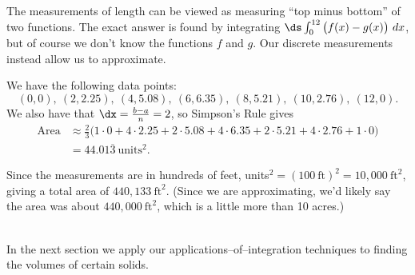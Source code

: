 {The measurements of length can be viewed as measuring ``top minus bottom'' of two functions. The exact answer is found by integrating $\ds \int_0^{12} \big(f(x)-g(x)\big)\ dx$, but of course we don't know the functions $f$ and $g$. Our discrete measurements instead allow us to approximate.

We have the following data points:
$$(0,0),\ (2,2.25),\ (4,5.08),\ (6,6.35),\ (8,5.21),\ (10,2.76),\ (12,0).$$
We also have that $\dx=\frac{b-a}{n} = 2$, so Simpson's Rule gives
\begin{align*}
\text{Area}&\approx \frac{2}{3}\Big(1\cdot0+4\cdot2.25+2\cdot5.08+4\cdot6.35+2\cdot5.21+4\cdot2.76+1\cdot0\Big)\\
			&= 44.01\overline{3} \ \text{units}^2.
\end{align*}

Since the measurements are in hundreds of feet, units$^2 = (100\ \text{ft})^2 = 10,000\ \text{ft}^2$, giving a total area of $440,133\ \text{ft}^2$. (Since we are approximating, we'd likely say the area was about $440,000\ \text{ft}^2$, which is a little more than 10 acres.)
}
\\

In the next section we apply our applications--of--integration techniques to finding the volumes of certain solids.

